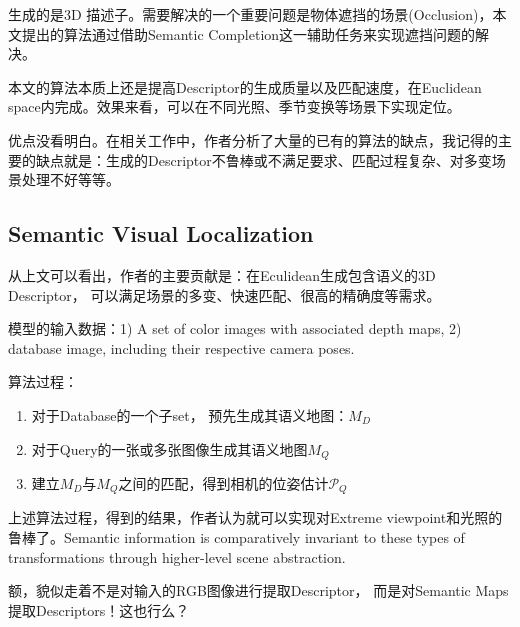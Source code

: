 生成的是3D 描述子。需要解决的一个重要问题是物体遮挡的场景(Occlusion)，本文提出的算法通过借助Semantic Completion这一辅助任务来实现遮挡问题的解决。

本文的算法本质上还是提高Descriptor的生成质量以及匹配速度，在Euclidean space内完成。效果来看，可以在不同光照、季节变换等场景下实现定位。

优点没看明白。在相关工作中，作者分析了大量的已有的算法的缺点，我记得的主要的缺点就是：生成的Descriptor不鲁棒或不满足要求、匹配过程复杂、对多变场景处理不好等等。

\subsection{Semantic Visual Localization}

从上文可以看出，作者的主要贡献是：在Eculidean生成包含语义的3D Descriptor， 可以满足场景的多变、快速匹配、很高的精确度等需求。 

模型的输入数据：1) A set of color images with associated depth maps, 2) database image, including their respective camera poses.

算法过程：
\begin{enumerate}
\item 对于Database的一个子set， 预先生成其语义地图：$M_D$
\item 对于Query的一张或多张图像生成其语义地图$M_Q$
\item 建立$M_D$与$M_Q$之间的匹配，得到相机的位姿估计$\mathcal{P}_Q$
\end{enumerate}

上述算法过程，得到的结果，作者认为就可以实现对Extreme viewpoint和光照的鲁棒了。Semantic information is
comparatively invariant to these types of transformations through higher-level scene abstraction.

额，貌似走着不是对输入的RGB图像进行提取Descriptor， 而是对Semantic Maps提取Descriptors！这也行么？

